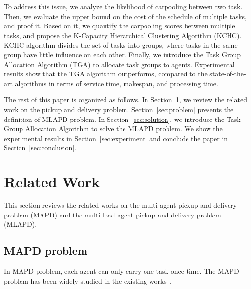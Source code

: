 \documentclass[sigconf,anonymous]{aamas}
\begin{document}
To address this issue,
we analyze the likelihood of carpooling between two task.
Then, we evaluate the upper bound on the cost of the schedule of multiple tasks,
and proof it.
Based on it, we quantify the carpooling scores between multiple tasks,
and propose the K-Capacity Hierarchical Clustering Algorithm (KCHC).
KCHC algorithm divides the set of tasks into groups,
where tasks in the same group have little influence on each other.
Finally, we introduce the Task Group Allocation Algorithm (TGA) to allocate task groups to agents.
Experimental results show that the TGA algorithm outperforms,
compared to the state-of-the-art algorithms
in terms of service time, makespan, and processing time.

The rest of this paper is organized as follows.
In Section~\ref{sec:related}, we review the related work on the pickup and delivery problem.
Section~\ref{sec:problem} presents the definition of MLAPD problem.
In Section~\ref{sec:solution}, we introduce the Task Group Allocation Algorithm to solve the MLAPD problem.
We show the experimental results in Section~\ref{sec:experiment}
and conclude the paper in Section~\ref{sec:conclusion}. 

\section{Related Work}
\label{sec:related}
This section reviews the related works on the multi-agent pickup and delivery problem (MAPD) 
and the multi-load agent pickup and delivery problem (MLAPD).
\subsection{MAPD problem}
\label{sec:SLAPD}
In MAPD problem, each agent can only carry one task once time.
The MAPD problem has been widely studied in the existing works~\cite{ma2017lifelong,wu2021multi,zhou2019balanced,wang2023efficient}.
\end{document}
